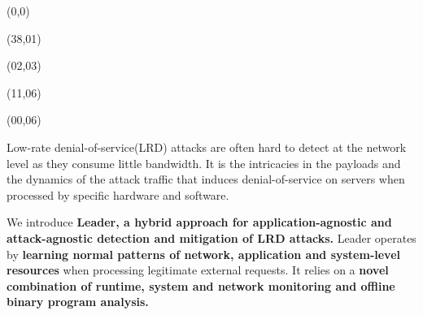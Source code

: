 \documentclass{article}
\def\LHead#1{\noindent{\LARGE\color{DarkBlue} #1}\bigskip}
\def\CHead#1{\begin{center}\noindent{\LARGE\color{DarkBlue} #1}\end{center}}
\renewcommand{\large}{\fontsize{29.86}{37}\selectfont}
\renewcommand{\LARGE}{\fontsize{43}{54}\selectfont}
\renewcommand{\Huge}{\fontsize{61.92}{77}\selectfont}
\begin{document}


\begin{textblock}{8}(0,0)
	\begin{center}
		\vspace{.15in}
		\end{center}
	\end{textblock}

\begin{textblock}{8}(38,01)
\begin{center}
\end{center}
\end{textblock}


\begin{textblock}{42}(02,03)
\begin{center}
\end{center}
\end{textblock}

\begin{textblock}{8}(11,06)
	{\Huge{\calligra Overview}}
\end{textblock}
\begin{textblock}{8}(00,06)
	\begin{tcolorbox}[boxsep=12pt,colback=yellow!10!white]
Low-rate denial-of-service(LRD) attacks are often hard to detect at the network level as they consume little bandwidth. It is the intricacies in the payloads and the dynamics of the attack traffic that induces denial-of-service on servers when processed by specific hardware and software.

We introduce \textbf{Leader, a hybrid approach for application-agnostic and attack-agnostic detection and mitigation of LRD attacks.} Leader operates by \textbf{learning normal patterns of network, application and system-level resources} when processing legitimate external requests. It relies on a \textbf{novel combination of runtime, system and network monitoring and offline binary program analysis.}
\end{tcolorbox}
\end{textblock}
\end{document}
